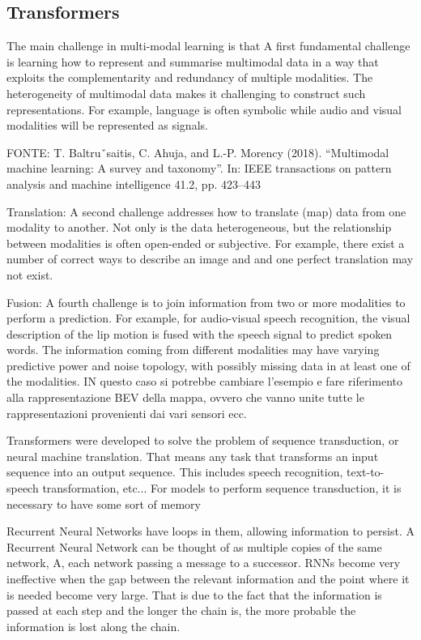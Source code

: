 \subsection{Transformers}
The main challenge in multi-modal learning is that A first fundamental challenge is learning how to
represent and summarise multimodal data in a way that exploits the
complementarity and redundancy of multiple modalities.
The heterogeneity of multimodal data makes it challenging to construct
such representations. For example, language is often symbolic while audio
and visual modalities will be represented as signals.

FONTE:
T. Baltruˇsaitis, C. Ahuja, and L.-P. Morency (2018). “Multimodal machine learning: A survey and taxonomy”. In: IEEE transactions on pattern
analysis and machine intelligence 41.2, pp. 423–443

Translation: A second challenge addresses how to translate (map) data
from one modality to another. Not only is the data heterogeneous, but
the relationship between modalities is often open-ended or subjective.
For example, there exist a number of correct ways to describe an image
and and one perfect translation may not exist.

Fusion: A fourth challenge is to join information from two or more
modalities to perform a prediction.
For example, for audio-visual speech recognition, the visual description of
the lip motion is fused with the speech signal to predict spoken words.
The information coming from different modalities may have varying
predictive power and noise topology, with possibly missing data in at least
one of the modalities. IN questo caso si potrebbe cambiare l'esempio e fare riferimento alla rappresentazione BEV della mappa, ovvero che vanno unite tutte le rappresentazioni provenienti dai vari sensori ecc. 

Transformers were developed to solve the problem of sequence transduction, or
neural machine translation.
That means any task that transforms an input sequence into an output
sequence. This includes speech recognition, text-to-speech transformation,
etc...
For models to perform sequence transduction, it is necessary to have some sort
of memory

Recurrent Neural Networks have loops in them, allowing information to persist.
A Recurrent Neural Network can be thought of as multiple copies of the same
network, A, each network passing a message to a successor.
RNNs become very ineffective when the gap between the relevant information
and the point where it is needed become very large.
That is due to the fact that the information is passed at each step and the
longer the chain is, the more probable the information is lost along the chain.

